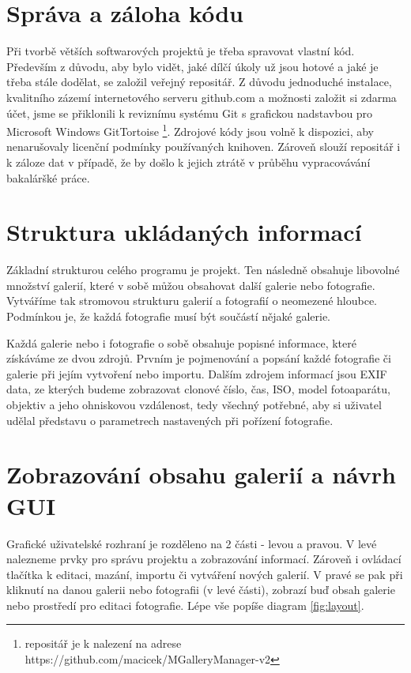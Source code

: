 \documentclass[11pt,twoside,a4paper]{book}
\begin{document}
\section{Správa a záloha kódu}
\noindent
Při tvorbě větších softwarových projektů je třeba spravovat vlastní kód. Především z důvodu, aby bylo vidět, jaké dílčí úkoly už jsou hotové a jaké je třeba stále dodělat, se založil veřejný repositář. Z důvodu jednoduché instalace, kvalitního zázemí internetového serveru github.com a možnosti založit si zdarma účet, jsme se přiklonili k reviznímu systému Git s grafickou nadstavbou pro Microsoft Windows GitTortoise \footnote{repositář je k nalezení na adrese https://github.com/macicek/MGalleryManager-v2}. Zdrojové kódy jsou volně k dispozici, aby nenarušovaly licenční podmínky používaných knihoven. Zároveň slouží repositář i k záloze dat v případě, že by došlo k jejich ztrátě v průběhu vypracovávání bakaláršké práce.

\section{Struktura ukládaných informací}
\noindent
Základní strukturou celého programu je projekt. Ten následně obsahuje libovolné množství galerií, které v sobě můžou obsahovat další galerie nebo fotografie. Vytváříme tak stromovou strukturu galerií a fotografií o neomezené hloubce. Podmínkou je, že každá fotografie musí být součástí nějaké galerie.

\indent
Každá galerie nebo i fotografie o sobě obsahuje popisné informace, které získáváme ze dvou zdrojů. Prvním je pojmenování a popsání každé fotografie či galerie při jejím vytvoření nebo importu. Dalším zdrojem informací jsou EXIF data, ze kterých budeme zobrazovat clonové číslo, čas, ISO, model fotoaparátu, objektiv a jeho ohniskovou vzdálenost, tedy všechný potřebné, aby si uživatel udělal představu o parametrech nastavených při pořízení fotografie.

\section{Zobrazování obsahu galerií a návrh GUI}
\noindent
Grafické uživatelské rozhraní je rozděleno na 2 části - levou a pravou. V levé nalezneme prvky pro správu projektu a zobrazování informací. Zároveň i  ovládací tlačítka k editaci, mazání, importu či vytváření nových galerií. V pravé se pak při kliknutí na danou galerii nebo fotografii (v levé části), zobrazí buď obsah galerie nebo prostředí pro editaci fotografie. Lépe vše popíše diagram \ref{fig:layout}.
\end{document}
